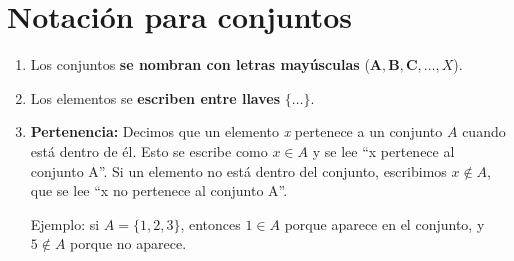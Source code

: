 \documentclass[12pt]{article}
\begin{document}
\section{Notación para conjuntos}
\begin{enumerate}
    \item Los conjuntos \textbf{se nombran con letras mayúsculas} ($\mathbf{A}, \mathbf{B}, \mathbf{C},\ldots ,X$).
    \item Los elementos se \textbf{escriben entre llaves} $\mathbf{\{\dots\}}$.
    \item \textbf{Pertenencia:} Decimos que un elemento \textit{x} pertenece a un conjunto \(A\) cuando está dentro de él. Esto se escribe como \(x \in A\) y se lee “x pertenece al conjunto A”.  
Si un elemento no está dentro del conjunto, escribimos \(x \notin A\), que se lee “x no pertenece al conjunto A”.

Ejemplo: si \(A = \{1,2,3\}\), entonces \(1 \in A\) porque aparece en el conjunto, y \(5 \notin A\) porque no aparece.
\end{enumerate}
\end{document}
